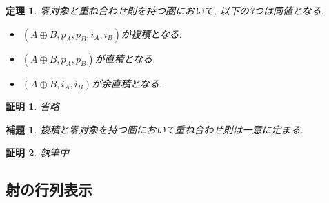 \documentclass[a4paper,12pt]{ltjsarticle}
\theoremstyle{break}
\newtheorem{lem}[thm]{補題}
\newtheorem{thrm}[thm]{定理}
\newtheorem*{prf}{証明}
\newcommand{\opl}{\oplus}
\numberwithin{equation}{section}
\begin{document}
\begin{thrm}
  零対象と重ね合わせ則を持つ圏において, 以下の3つは同値となる. 
  \begin{itemize}
    \item $(A \opl B, p_A, p_B, i_A, i_B)$が複積となる. 
    \item $(A \opl B, p_A, p_B)$が直積となる. 
    \item $(A \opl B, i_A, i_B)$が余直積となる. 
  \end{itemize}
\end{thrm}

\begin{prf}
  省略
\end{prf}

\begin{lem}
  複積と零対象を持つ圏において重ね合わせ則は一意に定まる. 
\end{lem}

\begin{prf}
  執筆中
\end{prf}

\subsection{射の行列表示}
\end{document}
